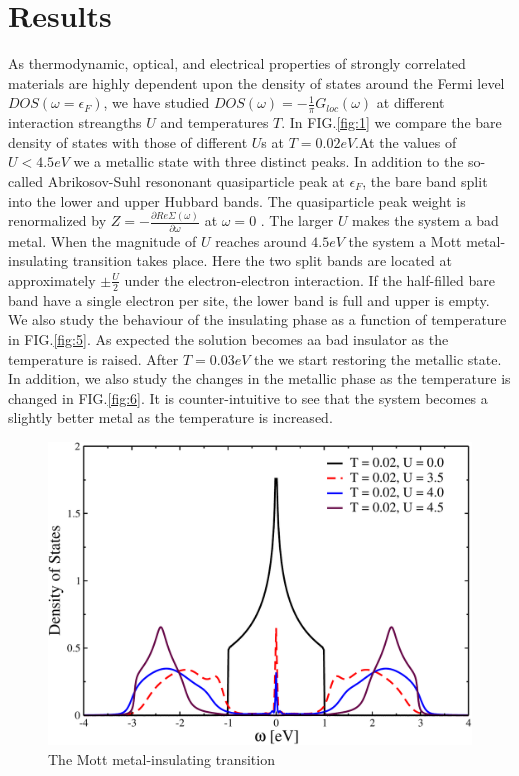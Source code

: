 \documentclass[aps,prl,twocolumn,showpacs,floatfix,superscriptaddress]{revtex4-1}
\begin{document}
\section{\label{sec:method}Results}
As thermodynamic, optical, and electrical properties of strongly correlated materials are highly dependent upon the density of states around the Fermi level $DOS(\omega = \epsilon_F)$, we have studied $DOS(\omega) = -\frac{1}{\pi}G_{loc}(\omega)$ at different interaction streangths $U$ and temperatures $T$. In FIG.\ref{fig:1} we compare the bare density of states with those of different $U$s at $T = 0.02 eV$.At the values of $U < 4.5 eV$ we a metallic state with three distinct peaks.  In addition to the so-called Abrikosov-Suhl resononant quasiparticle peak at $\epsilon_F$, the bare band split into the lower and upper Hubbard bands. The quasiparticle peak weight is renormalized by $Z = -\frac{\partial Re\Sigma(\omega)}{\partial \omega}$  at $\omega = 0$ \cite{muller}.  The larger $U$ makes the system a bad metal. When the magnitude of $U$ reaches around $4.5 eV$ the system a Mott metal-insulating transition takes place. Here the two split bands are located at approximately $\pm\frac{U}{2}$ under the electron-electron interaction. If the half-filled bare band have a single electron per site, the lower band is full and upper is empty. We also study the behaviour of the insulating phase as a function of temperature in FIG.\ref{fig:5}. As expected the solution becomes aa bad insulator as the temperature is raised. After $T = 0.03 eV$ the we start restoring the metallic state. In addition, we also study the changes in the metallic phase as the temperature is changed in FIG.\ref{fig:6}. It is counter-intuitive to see that the system becomes a slightly better metal as the temperature is increased.


	\begin{figure}
		\includegraphics[scale=0.3,angle=0]{u}
		\caption{The Mott metal-insulating transition}
		\label{fig:4}
	\end{figure}
\end{document}
